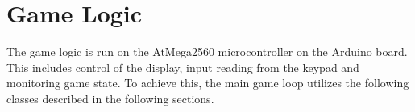 \section{Game Logic}
The game logic is run on the AtMega2560 microcontroller on the Arduino board. This includes control of the display, input reading from the keypad and monitoring game state. To achieve this, the main game loop utilizes the following classes described in the following sections.





